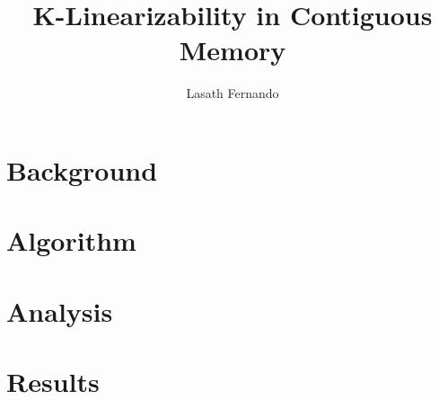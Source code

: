 \documentclass[a4paper,10pt]{article}
\title{K-Linearizability in Contiguous Memory}
\author{Lasath Fernando}
\begin{document}
\maketitle

\begin{abstract}

\end{abstract}

\section{Background}
\section{Algorithm}
\section{Analysis}
\section{Results}
\end{document}
